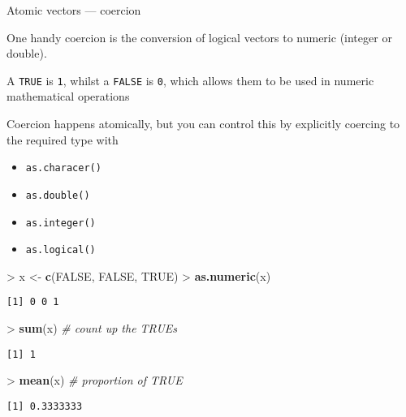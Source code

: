 \documentclass[10pt,ignorenonframetext,compress, aspectratio=169]{beamer}
\newenvironment{Shaded}{\begin{snugshade}}{\end{snugshade}}
\newcommand{\KeywordTok}[1]{\textcolor[rgb]{0.13,0.29,0.53}{\textbf{{#1}}}}
\newcommand{\StringTok}[1]{\textcolor[rgb]{0.31,0.60,0.02}{{#1}}}
\newcommand{\CommentTok}[1]{\textcolor[rgb]{0.56,0.35,0.01}{\textit{{#1}}}}
\newcommand{\OtherTok}[1]{\textcolor[rgb]{0.56,0.35,0.01}{{#1}}}
\newcommand{\NormalTok}[1]{{#1}}
\providecommand{\tightlist}{%
  \setlength{\itemsep}{0pt}\setlength{\parskip}{0pt}}
\begin{document}
\begin{frame}[fragile]{Atomic vectors --- coercion}

One handy coercion is the conversion of logical vectors to numeric
(integer or double).

A \texttt{TRUE} is \texttt{1}, whilst a \texttt{FALSE} is \texttt{0},
which allows them to be used in numeric mathematical operations

Coercion happens atomically, but you can control this by explicitly
coercing to the required type with

\begin{itemize}
\tightlist
\item
  \texttt{as.characer()}
\item
  \texttt{as.double()}
\item
  \texttt{as.integer()}
\item
  \texttt{as.logical()}
\end{itemize}

\begin{Shaded}
\begin{Highlighting}[]
\NormalTok{>}\StringTok{ }\NormalTok{x <-}\StringTok{ }\KeywordTok{c}\NormalTok{(}\OtherTok{FALSE}\NormalTok{, }\OtherTok{FALSE}\NormalTok{, }\OtherTok{TRUE}\NormalTok{)}
\NormalTok{>}\StringTok{ }\KeywordTok{as.numeric}\NormalTok{(x)}
\end{Highlighting}
\end{Shaded}

\begin{verbatim}
[1] 0 0 1
\end{verbatim}

\begin{Shaded}
\begin{Highlighting}[]
\NormalTok{>}\StringTok{ }\KeywordTok{sum}\NormalTok{(x)                                  }\CommentTok{# count up the TRUEs}
\end{Highlighting}
\end{Shaded}

\begin{verbatim}
[1] 1
\end{verbatim}

\begin{Shaded}
\begin{Highlighting}[]
\NormalTok{>}\StringTok{ }\KeywordTok{mean}\NormalTok{(x)                                 }\CommentTok{# proportion of TRUE}
\end{Highlighting}
\end{Shaded}

\begin{verbatim}
[1] 0.3333333
\end{verbatim}

\end{frame}
\end{document}
